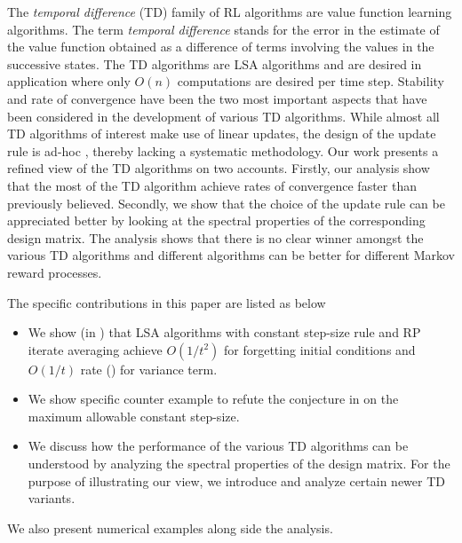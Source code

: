 The \emph{temporal difference} (TD) family of RL algorithms are value function learning algorithms. The term \emph{temporal difference} stands for the  error in the estimate of the value function obtained as a difference of terms involving the values in the successive states. The TD algorithms are LSA algorithms and are desired in application where only $O(n)$ computations are desired per time step. Stability and rate of convergence have been the two most important aspects that have been considered in the development of various TD algorithms. While almost all TD algorithms of interest make use of linear updates, the design of the update rule is ad-hoc \cite{}, thereby lacking a systematic methodology. Our work presents a refined view of the TD algorithms on two accounts. Firstly, our analysis show that the most of the TD algorithm achieve rates of convergence faster than previously believed. Secondly, we show that the choice of the update rule can be appreciated better by looking at the spectral properties of the corresponding design matrix. The analysis shows that there is no clear winner amongst the various TD algorithms and different algorithms can be better for different Markov reward processes.\par
The specific contributions in this paper are listed as below
\begin{itemize}[leftmargin=*] 
\item We show (in \Cref) that LSA algorithms with constant step-size rule and RP iterate averaging achieve $O(1/t^2)$ for forgetting initial conditions and $O(1/t)$ rate (\Cref) for variance term.
\item We show specific counter example to refute the conjecture in \cite{} on the maximum allowable constant step-size.
\item We discuss how the performance of the various TD algorithms can be understood by analyzing the spectral properties of the design matrix. For the purpose of illustrating our view, we introduce and analyze certain newer TD variants.
\end{itemize}
We also present numerical examples along side the analysis.
